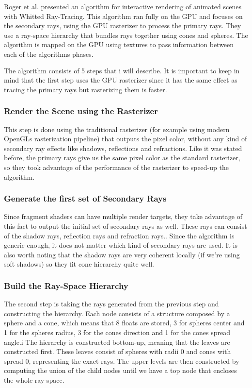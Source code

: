 Roger et al. \cite{Roger07} presented an algorithm for interactive rendering of animated scenes with Whitted Ray-Tracing. This algorithm ran fully on the GPU and focuses on the secondary rays, using the GPU rasterizer to process the primary rays. They use a ray-space hierarchy that bundles rays together using cones and spheres. The algorithm is mapped on the GPU using textures to pass information between each of the algorithms phases.

\medskip

The algorithm consists of 5 steps that i will describe. It is important to keep in mind that the first step uses the GPU rasterizer since it has the same effect as tracing the primary rays but rasterizing them is faster.

\subsubsection{Render the Scene using the Rasterizer}

This step is done using the traditional rasterizer (for example using modern OpenGLs rasterization pipeline) that outputs the pixel color, without any kind of secondary ray effects like shadows,  reflections and refractions. Like it was stated  before, the primary rays give us the same pixel color as the standard rasterizer, so they took advantage of the performance of the rasterizer to speed-up the algorithm.

\subsubsection{Generate the first set of Secondary Rays}

Since fragment shaders can have multiple render targets, they take advantage of this fact to output the initial set of secondary rays as well. These rays can consist of the shadow rays, reflection rays and refraction rays.. Since the algorithm is generic enough, it does not matter which kind of secondary rays are used. It is also worth noting that the shadow rays are very coherent locally (if we're using soft shadows) so they fit cone hierarchy quite well.

\subsubsection{Build the Ray-Space Hierarchy}

The second step is taking the rays generated from the previous step and constructing the hierarchy. Each node consists of a structure composed by a sphere and a cone, which means that 8 floats are stored, 3 for spheres center and 1 for the spheres radius, 3 for the cones direction and 1 for the cones spread angle.i The hierarchy is constructed bottom-up, meaning that the leaves are constructed first. These leaves consist of spheres with radii 0 and cones with spread 0, representing the exact rays. The upper levels are then constructed by computing the union of the child nodes until we have a top node that encloses the whole ray-space.

